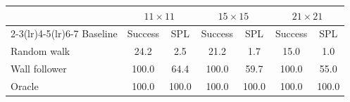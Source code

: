 \begin{tabular}{@{}lcccccc@{}}
\toprule
 & \multicolumn{2}{c}{$11\times11$} & \multicolumn{2}{c}{$15\times15$} & \multicolumn{2}{c}{$21\times21$} \\
\cmidrule(lr){2-3}\cmidrule(lr){4-5}\cmidrule(lr){6-7}
Baseline & Success & SPL & Success & SPL & Success & SPL \\
\midrule
Random walk & 24.2 & 2.5 & 21.2 & 1.7 & 15.0 & 1.0 \\
Wall follower & 100.0 & 64.4 & 100.0 & 59.7 & 100.0 & 55.0 \\
Oracle & 100.0 & 100.0 & 100.0 & 100.0 & 100.0 & 100.0 \\
\bottomrule
\end{tabular}
